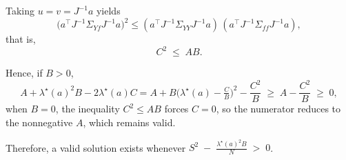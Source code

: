 \noindent
Taking $u=v=J^{-1}a$ yields\[
\big(a^\top J^{-1} \Sigma_{Yf} J^{-1} a\big)^2
\le
(a^\top J^{-1} \Sigma_{YY} J^{-1} a)\,
(a^\top J^{-1} \Sigma_{ff} J^{-1} a),
\]that is,\[
C^2\;\leq\; AB.
\]

\noindent
Hence, if $B>0$,\[
A+\lambda^\star(a)^2  B-2\lambda^\star(a)  C
= A + B\Big(\lambda^\star(a)-\tfrac{C}{B}\Big)^2 - \frac{C^2}{B}\;\ge\;A-\frac{C^2}{B}\;\ge\;0,
\]when $B=0$, the inequality $C^2\le AB$ forces $C=0$, so the numerator reduces to the nonnegative $A$, which remains valid.

\noindent
Therefore, a valid solution exists whenever $S^2 \;-\; \frac{\lambda^\star(a)^2 B}{N} \;>\; 0$.

